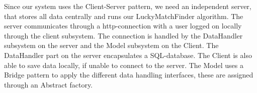 Since our system uses the Client-Server pattern, we need an independent server, that stores all data centrally and runs our LuckyMatchFinder algorithm. The server communicates through a http-connection with a user logged on locally through the client subsystem. The connection is handled by the DataHandler subsystem on the server and the Model subsystem on the Client. The DataHandler part on the server encapsulates a SQL-database. The Client is also able to save data locally, if unable to connect to the server. The Model uses a Bridge pattern to apply the different data handling interfaces, these are assigned through an Abstract factory.
